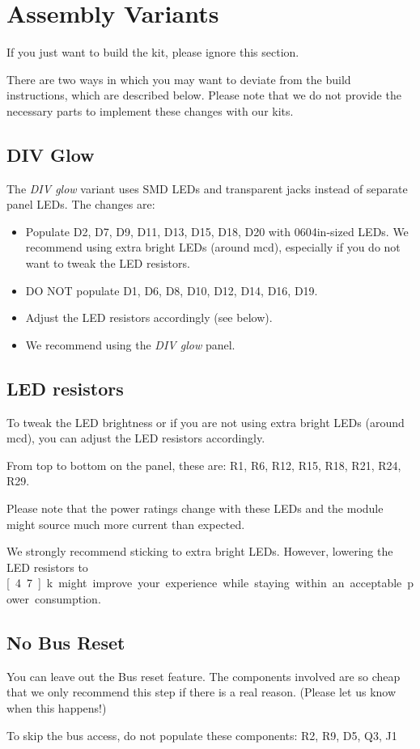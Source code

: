 \documentclass[a4paper,
               11pt,
               parskip=half,
               headinclude,
               titlepage=false]{scrartcl}
\begin{document}
\newpage



\section*{Assembly Variants}

If you just want to build the kit, please ignore this section.

There are two ways in which you may want to deviate from the build instructions, which are described below.
Please note that we do not provide the necessary parts to implement these changes with our kits. 

\subsection*{DIV Glow}

The \emph{DIV glow} variant uses SMD LEDs and transparent jacks instead of separate panel LEDs. The changes are:
\begin{itemize}[noitemsep]
 \item Populate D2, D7, D9, D11, D13, D15, D18, D20 with 0604in-sized LEDs. We recommend using extra bright LEDs (around \unit[200]{mcd}), especially if you do not want to tweak the LED resistors. 
 \item DO NOT populate D1, D6, D8, D10, D12, D14, D16, D19.
 \item Adjust the LED resistors accordingly (see below).
 \item We recommend using the \emph{DIV glow} panel.
\end{itemize}

\subsection*{LED resistors}

To tweak the LED brightness or if you are not using extra bright LEDs (around \unit[200]{mcd}), you can adjust the LED resistors accordingly.

From top to bottom on the panel, these are: R1, R6, R12, R15, R18, R21, R24, R29.

Please note that the power ratings change with these LEDs and the module might source much more current than expected.

We strongly recommend sticking to extra bright LEDs. However, lowering the LED resistors to \unit[4.7]{k} might improve your experience while staying within an acceptable power consumption.

\subsection*{No Bus Reset}

You can leave out the Bus reset feature. The components involved are so cheap that we only recommend this step if there is a real reason. (Please let us know when this happens!)

To skip the bus access, do not populate these components: R2, R9, D5, Q3, J1
\end{document}
